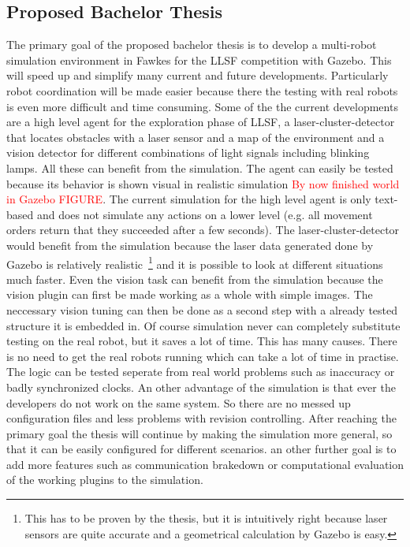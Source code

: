 \documentclass[11pt,a4paper,titlepage]{article}
\begin{document}
\subsection{Proposed Bachelor Thesis}
The primary goal of the proposed bachelor thesis is to develop a multi-robot simulation environment in Fawkes for the LLSF competition with Gazebo. This will speed up and simplify many current and future developments. Particularly robot coordination will be made easier because there the testing with real robots is even more difficult and time consuming. Some of the the current developments are a high level agent for the exploration phase of LLSF, a laser-cluster-detector that locates obstacles with a laser sensor and a map of the environment and a vision detector for different combinations of light signals including blinking lamps. All these can benefit from the simulation. The agent can easily be tested because its behavior is shown visual in realistic simulation \textcolor{red}{By now finished world in Gazebo FIGURE}. The current simulation for the high level agent is only text-based and does not simulate any actions on a lower level (e.g. all movement orders return that they succeeded after a few seconds). The laser-cluster-detector would benefit from the simulation because the laser data generated done by Gazebo is relatively realistic~\footnote{This has to be proven by the thesis, but it is intuitively right because laser sensors are quite accurate and a geometrical calculation by Gazebo is easy.} and it is possible to look at different situations much faster. Even the vision task can benefit from the simulation because the vision plugin can first be made working as a whole with simple images. The neccessary vision tuning can then be done as a second step with a already tested structure it is embedded in. Of course simulation never can completely substitute testing on the real robot, but it saves a lot of time. This has many causes. There is no need to get the real robots running which can take a lot of time in practise. The logic can be tested seperate from real world problems such as inaccuracy or badly synchronized clocks. An other advantage of the simulation is that ever the developers do not work on the same system. So there are no messed up configuration files and less problems with revision controlling. After reaching the primary goal the thesis will continue by making the simulation more general, so that it can be easily configured for different scenarios. an other further goal is to add more features such as communication brakedown or computational evaluation of the working plugins to the simulation.\\
\end{document}
